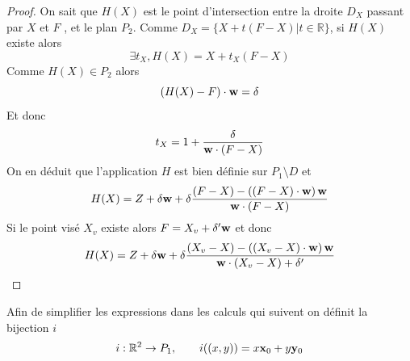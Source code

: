 \begin{proof}
On sait que $H(X)$ est le point d'intersection entre la droite $D_X$ passant par $X$ et $F$ , et le plan $P_2$.
Comme $D_{X}=\{X+t(F-X)|t\in\mathbb{R}\}$, si $H(X)$ existe alors 
\begin{equation*}
\exists t_{X},H(X)=X+t_{X}(F-X)
\end{equation*}
Comme $H(X)\in P_{2}$ alors
\begin{equation*}
(H(X)-F)\cdot \mathbf{w} =\delta
\end{equation*}
Et donc 
\begin{equation*}
t_{X}=1+\frac{\delta}{\mathbf{w} \cdot(F-X)}
\end{equation*}
 On en déduit que l'application $H$ est bien définie sur $P_{1}\setminus D$ et 
\begin{equation*}
H(X)=Z+\delta \mathbf{w}+\delta \frac{(F-X)-\left((F-X)\cdot \mathbf{w} \right) \mathbf{w}}{\mathbf{w} \cdot (F-X)}
\end{equation*}
Si le point visé $X_v$ existe alors  $F=X_v+\delta' \mathbf{w}$ et donc
\begin{equation*}
H(X)=Z+\delta \mathbf{w}+\delta \frac{(X_v-X)-\left((X_v-X)\cdot \mathbf{w} \right) \mathbf{w}}{\mathbf{w} \cdot (X_v-X)+\delta'}
\end{equation*}
\end{proof}
Afin de simplifier les expressions dans les calculs qui suivent on définit la bijection $i$ 
\begin{equation*}
i:\mathbb{R}^{2}\rightarrow P_{1},~~~~~~i((x,y))=x\mathbf{x}_{0}+y\mathbf{y}_{0}
\end{equation*}

